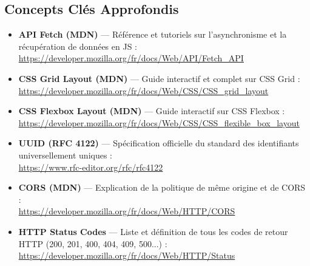 \subsection*{Concepts Clés Approfondis}
\begin{itemize}
    \item \textbf{API Fetch (MDN)} --- Référence et tutoriels sur l'asynchronisme et la récupération de données en JS :\\
    \href{https://developer.mozilla.org/fr/docs/Web/API/Fetch_API}{https://developer.mozilla.org/fr/docs/Web/API/Fetch\_API}

    \item \textbf{CSS Grid Layout (MDN)} --- Guide interactif et complet sur CSS Grid :\\
    \href{https://developer.mozilla.org/fr/docs/Web/CSS/CSS_grid_layout}{https://developer.mozilla.org/fr/docs/Web/CSS/CSS\_grid\_layout}

    \item \textbf{CSS Flexbox Layout (MDN)} --- Guide interactif sur CSS Flexbox :\\
    \href{https://developer.mozilla.org/fr/docs/Web/CSS/CSS_flexible_box_layout}{https://developer.mozilla.org/fr/docs/Web/CSS/CSS\_flexible\_box\_layout}

    \item \textbf{UUID (RFC 4122)} --- Spécification officielle du standard des identifiants universellement uniques :\\
    \href{https://www.rfc-editor.org/rfc/rfc4122}{https://www.rfc-editor.org/rfc/rfc4122}

    \item \textbf{CORS (MDN)} --- Explication de la politique de même origine et de CORS :\\
    \href{https://developer.mozilla.org/fr/docs/Web/HTTP/CORS}{https://developer.mozilla.org/fr/docs/Web/HTTP/CORS}

    \item \textbf{HTTP Status Codes} --- Liste et définition de tous les codes de retour HTTP (200, 201, 400, 404, 409, 500...) :\\
    \href{https://developer.mozilla.org/fr/docs/Web/HTTP/Status}{https://developer.mozilla.org/fr/docs/Web/HTTP/Status}
\end{itemize}

